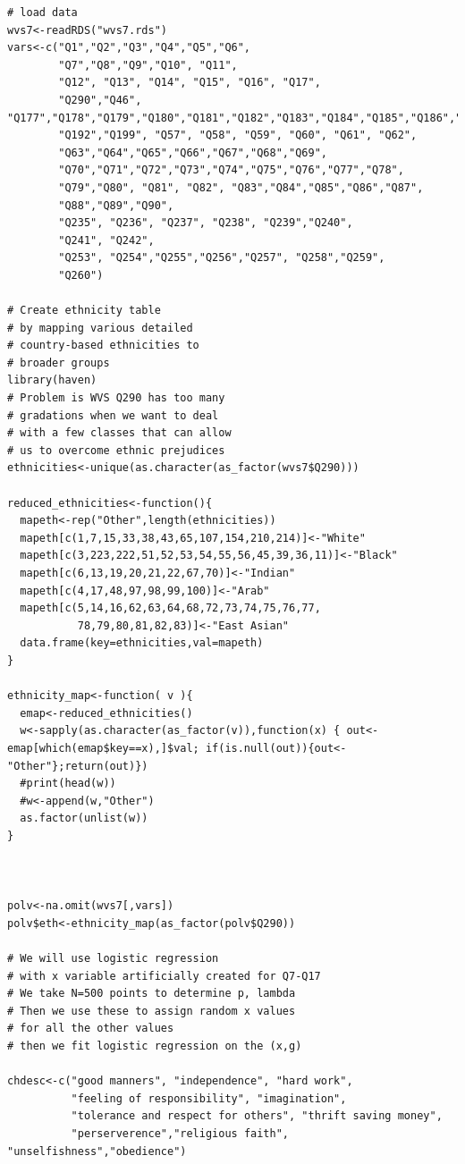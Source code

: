 \documentclass{amsart}
\begin{document}
\begin{verbatim}
# load data
wvs7<-readRDS("wvs7.rds")
vars<-c("Q1","Q2","Q3","Q4","Q5","Q6",
        "Q7","Q8","Q9","Q10", "Q11",
        "Q12", "Q13", "Q14", "Q15", "Q16", "Q17",
        "Q290","Q46", "Q177","Q178","Q179","Q180","Q181","Q182","Q183","Q184","Q185","Q186","Q187","Q188","Q189","Q190","Q191","Q192","Q193","Q194","Q195","Q275",
        "Q192","Q199", "Q57", "Q58", "Q59", "Q60", "Q61", "Q62",
        "Q63","Q64","Q65","Q66","Q67","Q68","Q69",
        "Q70","Q71","Q72","Q73","Q74","Q75","Q76","Q77","Q78",
        "Q79","Q80", "Q81", "Q82", "Q83","Q84","Q85","Q86","Q87",
        "Q88","Q89","Q90", 
        "Q235", "Q236", "Q237", "Q238", "Q239","Q240",
        "Q241", "Q242",
        "Q253", "Q254","Q255","Q256","Q257", "Q258","Q259", 
        "Q260")

# Create ethnicity table 
# by mapping various detailed
# country-based ethnicities to
# broader groups
library(haven)
# Problem is WVS Q290 has too many 
# gradations when we want to deal 
# with a few classes that can allow 
# us to overcome ethnic prejudices
ethnicities<-unique(as.character(as_factor(wvs7$Q290)))

reduced_ethnicities<-function(){
  mapeth<-rep("Other",length(ethnicities))
  mapeth[c(1,7,15,33,38,43,65,107,154,210,214)]<-"White"
  mapeth[c(3,223,222,51,52,53,54,55,56,45,39,36,11)]<-"Black"
  mapeth[c(6,13,19,20,21,22,67,70)]<-"Indian"
  mapeth[c(4,17,48,97,98,99,100)]<-"Arab"
  mapeth[c(5,14,16,62,63,64,68,72,73,74,75,76,77,
           78,79,80,81,82,83)]<-"East Asian"
  data.frame(key=ethnicities,val=mapeth)
}

ethnicity_map<-function( v ){
  emap<-reduced_ethnicities()
  w<-sapply(as.character(as_factor(v)),function(x) { out<-emap[which(emap$key==x),]$val; if(is.null(out)){out<-"Other"};return(out)})
  #print(head(w))
  #w<-append(w,"Other")
  as.factor(unlist(w))
}



polv<-na.omit(wvs7[,vars])
polv$eth<-ethnicity_map(as_factor(polv$Q290))

# We will use logistic regression
# with x variable artificially created for Q7-Q17
# We take N=500 points to determine p, lambda
# Then we use these to assign random x values
# for all the other values
# then we fit logistic regression on the (x,g)

chdesc<-c("good manners", "independence", "hard work",
          "feeling of responsibility", "imagination", 
          "tolerance and respect for others", "thrift saving money",
          "perserverence","religious faith", "unselfishness","obedience")


\end{verbatim}
\end{document}
